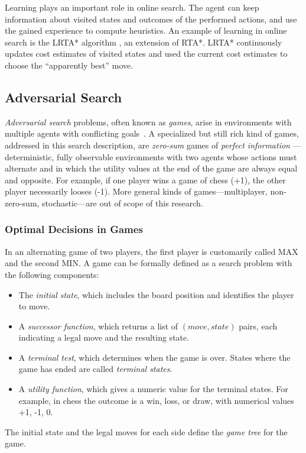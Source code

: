 Learning plays an important role in online search. The agent can keep
information about visited states and outcomes of the performed
actions, and use the gained experience to compute heuristics. An
example of learning in online search is the LRTA* algorithm
\cite{Korf.rta}, an extension of RTA*. LRTA* continuously
updates cost estimates of visited states and used the current cost
estimates to choose the ``apparently best'' move.

\subsection{Adversarial Search}

{\em Adversarial search} problems, often known as {\em games}, arise
in environments with multiple agents with conflicting
goals~\cite{Russell.aima}. A specialized but still rich kind of games,
addressed in this search description, are {\em zero-sum} games of {\em
  perfect information} --- deterministic, fully observable
environments with two agents whose actions must alternate and in which
the utility values at the end of the game are always equal and
opposite. For example, if one player wins a game of chess (+1), the
other player necessarily looses (-1).  More general kinds of
games---multiplayer, non-zero-sum, stochastic---are out of scope of
this research.

\subsubsection{Optimal Decisions in Games}

In an alternating game of two players, the first player is customarily
called MAX and the second MIN. A game can be formally defined as a
search problem with the following components:
\begin{itemize}
\item The {\em initial state}, which includes the board position and
  identifies the player to move.
\item A {\em successor function}, which returns a list of $(move,
  state)$ pairs, each indicating a legal move and the resulting state.
\item A {\em terminal test}, which determines when the game is
  over. States where the game has ended are called {\em terminal
    states}.
\item A {\em utility function}, which gives a numeric value for the
  terminal states. For example, in chess the outcome is a win, loss,
  or draw, with numerical values +1, -1, 0.
\end{itemize}
The initial state and the legal moves for each side define the {\em
  game tree} for the game.

